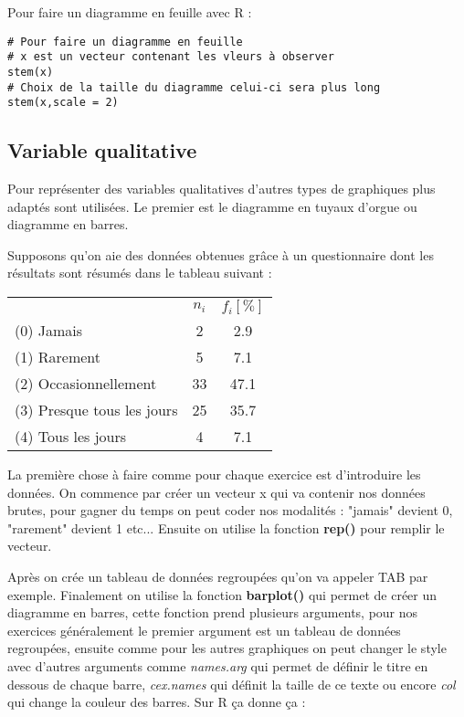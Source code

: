 \documentclass{report}
\begin{document}
Pour faire un diagramme en feuille avec R :
\begin{verbatim}
# Pour faire un diagramme en feuille
# x est un vecteur contenant les vleurs à observer
stem(x)
# Choix de la taille du diagramme celui-ci sera plus long
stem(x,scale = 2)  
\end{verbatim}

\subsection{Variable qualitative}

Pour représenter des variables qualitatives d'autres types de graphiques plus adaptés sont utilisées. Le premier est le diagramme en tuyaux d'orgue ou diagramme en barres.

Supposons qu'on aie des données obtenues grâce à un questionnaire dont les résultats sont résumés dans le tableau suivant :

\quad
\begin{center}
\begin{tabular}{l c c} 
\hline
  &$n_i$& $f_i [\%] $\\ \cline{2-3}
(0) Jamais & 2 & 2.9  \\
(1) Rarement & 5 & 7.1  \\
(2) Occasionnellement & 33 & 47.1  \\
(3) Presque tous les jours & 25 & 35.7  \\
(4) Tous les jours & 4 & 7.1  \\
\hline
\end{tabular}
\end{center}
\quad

La première chose à faire comme pour chaque exercice est d'introduire les données. On commence par créer un vecteur x qui va contenir nos données brutes, pour gagner du temps on peut coder nos modalités : "jamais" devient 0, "rarement" devient 1 etc... Ensuite on utilise la fonction \textbf{rep()} pour remplir le vecteur.

Après on crée un tableau de données regroupées qu'on va appeler TAB par exemple.
Finalement on utilise la fonction \textbf{barplot()} qui permet de créer un diagramme en barres, cette fonction prend plusieurs arguments, pour nos exercices généralement le premier argument est un tableau de données regroupées, ensuite comme pour les autres graphiques on peut changer le style avec d'autres arguments comme \textit{names.arg} qui permet de définir le titre en dessous de chaque barre, \textit{cex.names} qui définit la taille de ce texte ou encore \textit{col} qui change la couleur des barres. Sur R ça donne ça :
\end{document}
